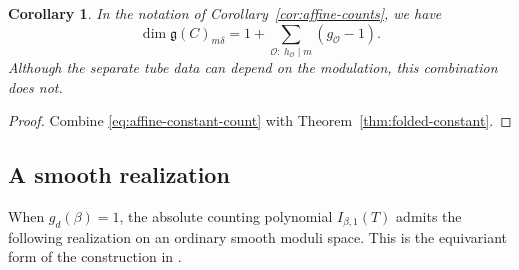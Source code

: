 \documentclass[11pt, reqno]{amsart}
\numberwithin{equation}{section}
\newtheorem{corollary}[theorem]{Corollary}
\theoremstyle{definition}
\theoremstyle{remark}
\newcommand{\mc}[1]{\mathcal{#1}}
\newcommand{\OO}{\mc O}
\begin{document}
\begin{corollary}\label{cor:affine-lie-multiplicity}
In the notation of Corollary~\ref{cor:affine-counts}, we have
\[ \dim\mathfrak g(C)_{m\delta} =1+\sum_{\OO:\ h_{\OO}\mid m} (g_{\OO}-1). \]
Although the separate tube data can depend on the modulation, this
combination does not.
\end{corollary}
\begin{proof}
Combine \eqref{eq:affine-constant-count} with
Theorem~\ref{thm:folded-constant}.
\end{proof}

\subsection{A smooth realization}
When $g_d(\beta)=1$, the absolute counting polynomial
$I_{\beta,1}(T)$ admits the following realization on an ordinary
smooth moduli space. This is the equivariant form of
the construction in \cite{CBVdB}.
\end{document}
